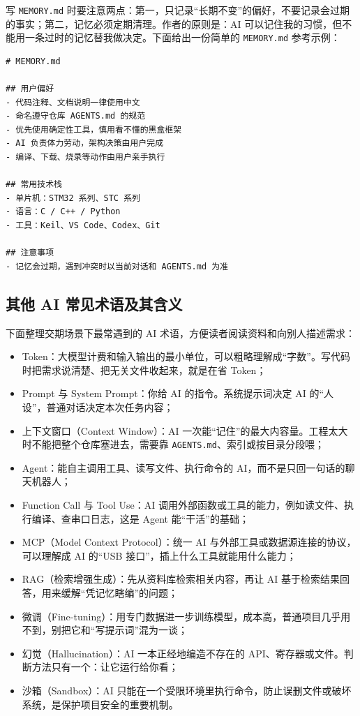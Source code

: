 写 \texttt{MEMORY.md} 时要注意两点：第一，只记录“长期不变”的偏好，不要记录会过期的事实；第二，记忆必须定期清理。作者的原则是：AI 可以记住我的习惯，但不能用一条过时的记忆替我做决定。下面给出一份简单的 \texttt{MEMORY.md} 参考示例：

\begin{lstlisting}
# MEMORY.md

## 用户偏好
- 代码注释、文档说明一律使用中文
- 命名遵守仓库 AGENTS.md 的规范
- 优先使用确定性工具，慎用看不懂的黑盒框架
- AI 负责体力劳动，架构决策由用户完成
- 编译、下载、烧录等动作由用户亲手执行

## 常用技术栈
- 单片机：STM32 系列、STC 系列
- 语言：C / C++ / Python
- 工具：Keil、VS Code、Codex、Git

## 注意事项
- 记忆会过期，遇到冲突时以当前对话和 AGENTS.md 为准
\end{lstlisting}

\subsection{其他 AI 常见术语及其含义}

下面整理交期场景下最常遇到的 AI 术语，方便读者阅读资料和向别人描述需求：

\begin{itemize}
\item Token：大模型计费和输入输出的最小单位，可以粗略理解成“字数”。写代码时把需求说清楚、把无关文件收起来，就是在省 Token；
\item Prompt 与 System Prompt：你给 AI 的指令。系统提示词决定 AI 的“人设”，普通对话决定本次任务内容；
\item 上下文窗口（Context Window）：AI 一次能“记住”的最大内容量。工程太大时不能把整个仓库塞进去，需要靠 \texttt{AGENTS.md}、索引或按目录分段喂；
\item Agent：能自主调用工具、读写文件、执行命令的 AI，而不是只回一句话的聊天机器人；
\item Function Call 与 Tool Use：AI 调用外部函数或工具的能力，例如读文件、执行编译、查串口日志，这是 Agent 能“干活”的基础；
\item MCP（Model Context Protocol）：统一 AI 与外部工具或数据源连接的协议，可以理解成 AI 的“USB 接口”，插上什么工具就能用什么能力；
\item RAG（检索增强生成）：先从资料库检索相关内容，再让 AI 基于检索结果回答，用来缓解“凭记忆瞎编”的问题；
\item 微调（Fine-tuning）：用专门数据进一步训练模型，成本高，普通项目几乎用不到，别把它和“写提示词”混为一谈；
\item 幻觉（Hallucination）：AI 一本正经地编造不存在的 API、寄存器或文件。判断方法只有一个：让它运行给你看；
\item 沙箱（Sandbox）：AI 只能在一个受限环境里执行命令，防止误删文件或破坏系统，是保护项目安全的重要机制。
\end{itemize}

